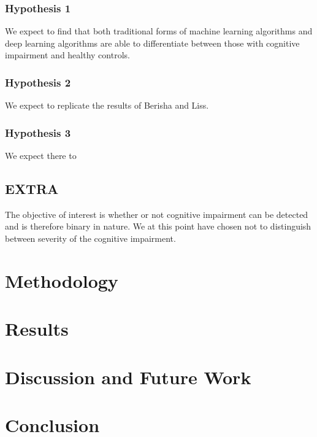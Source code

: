 \documentclass{article}
\begin{document}
\subsubsection{Hypothesis 1}
We expect to find that both traditional forms of machine learning algorithms and deep learning algorithms are able to differentiate between those with cognitive impairment and healthy controls. 
\subsubsection{Hypothesis 2}
We expect to replicate the results of Berisha and Liss.
\subsubsection{Hypothesis 3}
We expect there to 
\subsection{EXTRA}
The objective of interest is whether or not cognitive impairment can be detected and is therefore binary in nature. We at this point have chosen not to distinguish between severity of the cognitive impairment.
\section{Methodology}
\section{Results}
\section{Discussion and Future Work}
\section{Conclusion}


\end{document}

